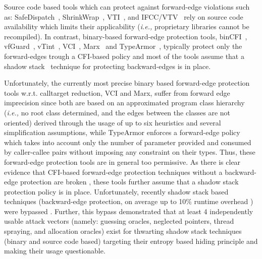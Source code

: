 Source code based tools which can protect against forward-edge violations such as: SafeDispatch~\cite{safedispatch:jang}, ShrinkWrap~\cite{haller:shrinkwrap}, VTI~\cite{bounov:interleaving}, 
and IFCC/VTV~\cite{vtv:tice} rely on source code availability which limits their applicability (\textit{i.e.,} proprietary libraries cannot be recompiled).
In contrast, binary-based forward-edge protection tools, binCFI~\cite{ccfir:zhang}, vfGuard~\cite{vfuard:aravind}, 
vTint~\cite{vtint:zhang}, VCI~\cite{vci:asiaccs}, Marx~\cite{marx} and TypeArmor~\cite{veen:typearmor}, typically protect only the forward-edges trough a CFI-based 
policy and most of the tools assume that a shadow stack~\cite{volodymyr:cpi} technique for protecting backward-edges is in place.


Unfortunately, the currently most precise binary based forward-edge protection tools w.r.t. calltarget reduction, 
VCI and Marx, suffer from forward edge imprecision since both are based on an approximated program class hierarchy  
(\textit{i.e.,} no root class determined, and the edges between the classes are not oriented) derived through the usage of up to 
six heuristics and several simplification assumptions, while TypeArmor enforces a forward-edge policy which takes into account only the number of parameter 
provided and consumed by caller-callee pairs without imposing any constraint on their types. 
Thus, these forward-edge protection tools are in general too permissive.
As there is clear evidence that CFI-based forward-edge protection techniques without a backward-edge protection are broken \cite{carlini:bending}, these tools further assume
that a shadow stack protection policy is in place. Unfortunately, recently shadow stack based techniques (backward-edge protection, on 
average up to 10\% runtime overhead \cite{shadowstack:overhead})
were bypassed \cite{safestack:bypass, safestack:bypassing}. Further, this bypass demonstrated that at least 4 independently 
usable attack vectors (namely: guessing oracles, neglected pointers, thread spraying,
and allocation oracles) exist for thwarting shadow stack techniques 
(binary and source code based) targeting their entropy based hiding principle and making their usage questionable.

